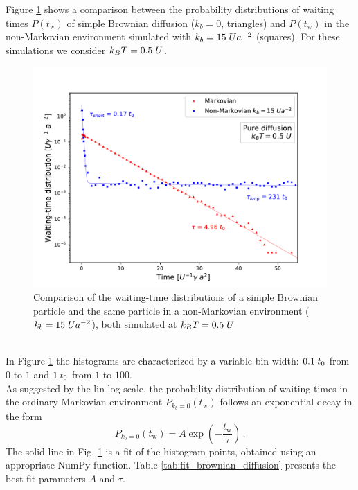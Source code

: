 Figure \ref{P_kb15} shows a comparison between the probability distributions of waiting times $P(t_\text{w})$ of simple Brownian diffusion ($k_b=0$, triangles) and $P(t_\text{w})$ in the non-Markovian environment simulated with $k_b=15\hspace{0.1cm}Ua^{-2}$ (squares). For these simulations we consider $k_BT=0.5 \hspace{0.1cm}U$.
\begin{figure}[h!]
    \centering
    \includegraphics[width=\textwidth]{kb15_T05.pdf}
    \caption{Comparison of the waiting-time distributions of a simple Brownian particle and the same particle in a non-Markovian environment ($k_b=15\hspace{0.1cm}Ua^{-2}$), both simulated at $k_BT = 0.5\hspace{0.1cm}U$}
    \label{P_kb15}
\end{figure}
\\
In Figure \ref{P_kb15} the histograms are characterized by a variable bin width: $0.1\hspace{0.1cm}t_0$ from $0$ to $1$ and $1\hspace{0.1cm}t_0$ from $1$ to $100$.
\\
As suggested by the lin-log scale, the probability distribution of waiting times in the ordinary Markovian environment $P_{k_b=0}(t_\text{w})$ follows an exponential decay in the form 
\begin{equation}
    P_{k_b=0}(t_\text{w})= A \exp{\left(- \dfrac{t_\text{w}}{\tau}\right)}\,.
    \label{eq:P_kb0}
\end{equation}
The solid line in Fig. \ref{P_kb15} is a fit of the histogram points, obtained using an appropriate NumPy function. Table \ref{tab:fit_brownian_diffusion} presents the best fit parameters $A$ and $\tau$.
